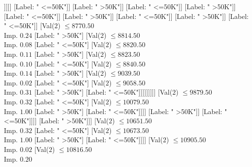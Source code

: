 \documentclass[margin=10pt]{standalone}
\begin{document}
\begin{forest}
																																	[Label: " <=50K"]
																																	[Val($2$) $ \leq 7707.50$ \\ Imp. $0.07$
																																		[Label: " >50K"]
																																		[Label: " <=50K"]]]]]
																														[Label: " <=50K"]]
																													[Label: " >50K"]]
																												[Label: " <=50K"]]
																											[Label: " >50K"]]
																										[Label: " <=50K"]]
																									[Label: " >50K"]]
																								[Label: " <=50K"]]
																							[Label: " >50K"]]
																						[Label: " <=50K"]]
																					[Val($2$) $ \leq 8770.50$ \\ Imp. $0.24$
																						[Label: " >50K"]
																						[Val($2$) $ \leq 8814.50$ \\ Imp. $0.08$
																							[Label: " <=50K"]
																							[Val($2$) $ \leq 8820.50$ \\ Imp. $0.11$
																								[Label: " >50K"]
																								[Val($2$) $ \leq 8823.50$ \\ Imp. $0.10$
																									[Label: " <=50K"]
																									[Val($2$) $ \leq 8840.50$ \\ Imp. $0.14$
																										[Label: " >50K"]
																										[Val($2$) $ \leq 9039.50$ \\ Imp. $0.02$
																											[Label: " <=50K"]
																											[Val($2$) $ \leq 9058.50$ \\ Imp. $0.31$
																												[Label: " >50K"]
																												[Label: " <=50K"]]]]]]]]]
																				[Val($2$) $ \leq 9879.50$ \\ Imp. $0.32$
																					[Label: " <=50K"]
																					[Val($2$) $ \leq 10079.50$ \\ Imp. $1.00$
																						[Label: " >50K"]
																						[Label: " <=50K"]]]]
																			[Label: " >50K"]]
																		[Label: " <=50K"]]]]
															[Label: " >50K"]]]
													[Val($2$) $ \leq 10651.50$ \\ Imp. $0.32$
														[Label: " <=50K"]
														[Val($2$) $ \leq 10673.50$ \\ Imp. $1.00$
															[Label: " >50K"]
															[Label: " <=50K"]]]]
												[Val($2$) $ \leq 10905.50$ \\ Imp. $0.02$
													[Val($2$) $ \leq 10816.50$ \\ Imp. $0.20$

\end{forest}
\end{document}
